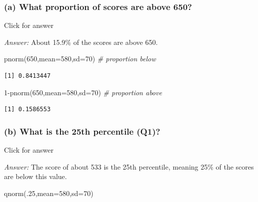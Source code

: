 \documentclass[
]{book}
\newenvironment{Shaded}{\begin{snugshade}}{\end{snugshade}}
\newcommand{\AttributeTok}[1]{\textcolor[rgb]{0.77,0.63,0.00}{#1}}
\newcommand{\CommentTok}[1]{\textcolor[rgb]{0.56,0.35,0.01}{\textit{#1}}}
\newcommand{\DecValTok}[1]{\textcolor[rgb]{0.00,0.00,0.81}{#1}}
\newcommand{\FunctionTok}[1]{\textcolor[rgb]{0.00,0.00,0.00}{#1}}
\newcommand{\NormalTok}[1]{#1}
\newcommand{\SpecialCharTok}[1]{\textcolor[rgb]{0.00,0.00,0.00}{#1}}
\begin{document}
\hypertarget{a-what-proportion-of-scores-are-above-650}{%
\subsubsection{(a) What proportion of scores are above 650?}\label{a-what-proportion-of-scores-are-above-650}}

Click for answer

\emph{Answer:} About 15.9\% of the scores are above 650.

\begin{Shaded}
\begin{Highlighting}[]
\FunctionTok{pnorm}\NormalTok{(}\DecValTok{650}\NormalTok{,}\AttributeTok{mean=}\DecValTok{580}\NormalTok{,}\AttributeTok{sd=}\DecValTok{70}\NormalTok{) }\CommentTok{\# proportion below}
\end{Highlighting}
\end{Shaded}

\begin{verbatim}
[1] 0.8413447
\end{verbatim}

\begin{Shaded}
\begin{Highlighting}[]
\DecValTok{1}\SpecialCharTok{{-}}\FunctionTok{pnorm}\NormalTok{(}\DecValTok{650}\NormalTok{,}\AttributeTok{mean=}\DecValTok{580}\NormalTok{,}\AttributeTok{sd=}\DecValTok{70}\NormalTok{) }\CommentTok{\# proportion above}
\end{Highlighting}
\end{Shaded}

\begin{verbatim}
[1] 0.1586553
\end{verbatim}

\hypertarget{b-what-is-the-25th-percentile-q1}{%
\subsubsection{(b) What is the 25th percentile (Q1)?}\label{b-what-is-the-25th-percentile-q1}}

Click for answer

\emph{Answer:} The score of about 533 is the 25th percentile, meaning 25\% of the scores are below this value.

\begin{Shaded}
\begin{Highlighting}[]
\FunctionTok{qnorm}\NormalTok{(.}\DecValTok{25}\NormalTok{,}\AttributeTok{mean=}\DecValTok{580}\NormalTok{,}\AttributeTok{sd=}\DecValTok{70}\NormalTok{)}
\end{Highlighting}
\end{Shaded}
\end{document}
